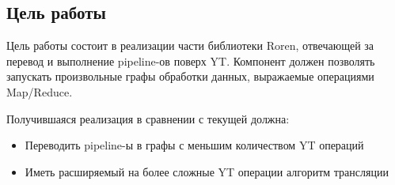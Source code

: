 \subsection{Цель работы}

Цель работы состоит в реализации части библиотеки Roren, отвечающей за перевод и выполнение pipeline-ов поверх YT. Компонент должен позволять запускать произвольные графы обработки данных, выражаемые операциями Map/Reduce.

Получившаяся реализация в сравнении с текущей должна:
\begin{itemize}
    \item Переводить pipeline-ы в графы с меньшим количеством YT операций
    \item Иметь расширяемый на более сложные YT операции алгоритм трансляции
\end{itemize}
